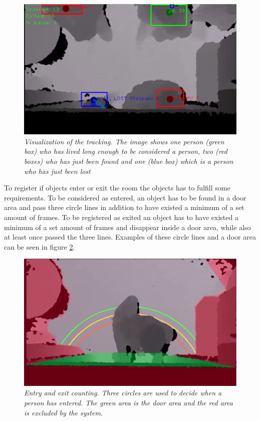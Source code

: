 \begin{figure}[htb]
	\centering
	\includegraphics[width=0.7\linewidth]{images/trackingexample2.png}
	\caption[Tracking visualization]{\textit{Visualization of the tracking. The image shows one person (green box) who has lived long enough to be considered a person, two (red boxes) who has just been found and one (blue box) which is a person who has just been lost}}
	\label{fig:trackingexample}  %
\end{figure}


To register if objects enter or exit the room the objects has to fulfill some requirements. To be considered as entered, an object has to be found in a door area and pass three circle lines in addition to have existed a minimum of a set amount of frames. To be registered as exited an object has to have existed a minimum of a set amount of frames and disappear inside a door area, while also at least once passed the three lines. Examples of these circle lines and a door area can be seen in figure \ref{fig:entry_exit}.

\begin{figure}[htb]
	\centering
	\includegraphics[width=0.7\linewidth]{images/entryexitexample.png}
	\caption[Checkpoint circles]{\textit{Entry and exit counting. Three circles are used to decide when a person has entered. The green area is the door area and the red area is excluded by the system.}}
	\label{fig:entry_exit}  %
\end{figure}

